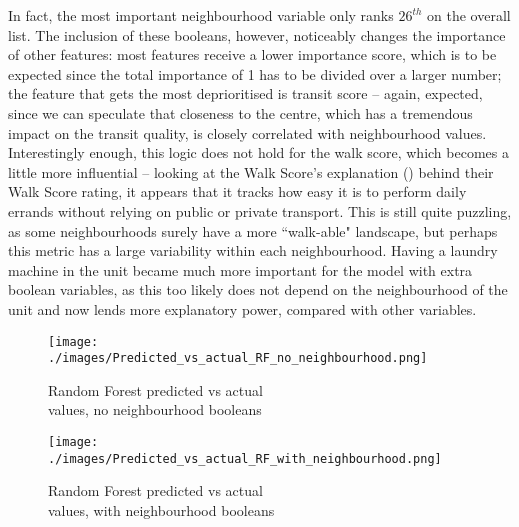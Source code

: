 \documentclass[12pt]{report}
\begin{document}
In fact, the most important neighbourhood variable only ranks $26^{th}$ on the overall list. The inclusion of these booleans, however, noticeably changes the importance of other features: most features receive a lower importance score, which is to be expected since the total importance of 1 has to be divided over a larger number; the feature that gets the most deprioritised is transit score -- again, expected, since we can speculate that closeness to the centre, which has a tremendous impact on the transit quality, is closely correlated with neighbourhood values. Interestingly enough, this logic does not hold for the walk score, which becomes a little more influential -- looking at the Walk Score's explanation (\cite{WalkScore2024}) behind their Walk Score rating, it appears that it tracks how easy it is to perform daily errands without relying on public or private transport. This is still quite puzzling, as some neighbourhoods surely have a more ``walk-able" landscape, but perhaps this metric has a large variability within each neighbourhood. Having a laundry machine in the unit became much more important for the model with extra boolean variables, as this too likely does not depend on the neighbourhood of the unit and now lends more explanatory power, compared with other variables.

\begin{figure}[ht]
	\begin{minipage}[t]{0.47\textwidth}
		\centering
		\texttt{[image: ./images/Predicted\_vs\_actual\_RF\_no\_neighbourhood.png]}
		\caption{Random Forest predicted vs actual \\ values, no neighbourhood booleans}
		\label{fig:rf-scatterplot-test-no-neighbourhood}
	\end{minipage}
	\begin{minipage}[t]{0.47\textwidth}
		\centering
		\texttt{[image: ./images/Predicted\_vs\_actual\_RF\_with\_neighbourhood.png]}
		\caption{Random Forest predicted vs actual \\ values, with neighbourhood booleans}
		\label{fig:rf-scatterplot-test}
	\end{minipage}
\end{figure}
\end{document}
